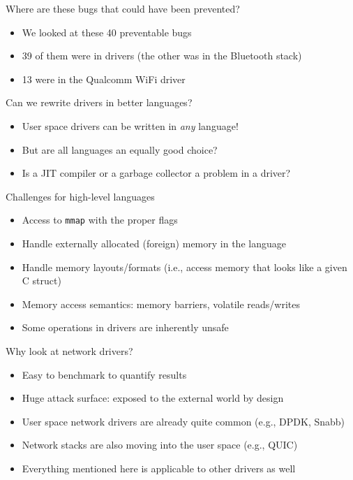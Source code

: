 \documentclass[NET,english,aspectratio=169,notitleframe]{tumbeamer}
\begin{document}
\begin{frame}{Where are these bugs that could have been prevented?}
\begin{itemize}
\item We looked at these 40 preventable bugs
\item 39 of them were in drivers (the other was in the Bluetooth stack)
\pause
\item 13 were in the Qualcomm WiFi driver
\end{itemize}
\end{frame}





\begin{frame}{Can we rewrite drivers in better languages?}
\begin{itemize}
\item User space drivers can be written in \emph{any} language!
\item But are all languages an equally good choice?
\item Is a JIT compiler or a garbage collector a problem in a driver?
\end{itemize}
\end{frame}


\begin{frame}{Challenges for high-level languages}
\begin{itemize}
\item Access to \texttt{mmap} with the proper flags
\item Handle externally allocated (foreign) memory in the language
\item Handle memory layouts/formats (i.e., access memory that looks like a given C struct)
\item Memory access semantics: memory barriers, volatile reads/writes
\item Some operations in drivers are inherently unsafe
\end{itemize}
\end{frame}


\begin{frame}{Why look at network drivers?}
\begin{itemize}
\item Easy to benchmark to quantify results
\item Huge attack surface: exposed to the external world by design
\item User space network drivers are already quite common (e.g., DPDK, Snabb)
\item Network stacks are also moving into the user space (e.g., QUIC)
\pause
\item Everything mentioned here is applicable to other drivers as well
\end{itemize}
\end{frame}
\end{document}
